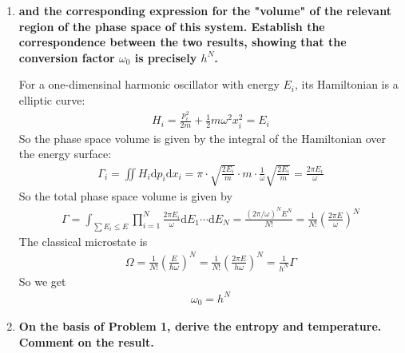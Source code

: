 \documentclass[../../main.tex]{subfiles}
\begin{document}
\begin{enumerate}
    \item \textbf{and the corresponding expression for the "volume" of the relevant region of the phase space of this system. Establish the correspondence between the two results, showing that the conversion factor $\omega_{0}$ is precisely $h^{N}$.}
    
    For a one-dimensinal harmonic oscillator with energy $E_{i}$, its Hamiltonian is a elliptic curve: 
    \begin{align*}
      H_{i} = \frac{p_{i}^{2}}{2m} + \frac{1}{2}m\omega^{2}x_{i}^{2} = E_{i}
    \end{align*}
    So the phase space volume is given by the integral of the Hamiltonian over the energy surface:
    \begin{align*}
      \Gamma_{i} = \iint H_{i}\mathrm{d}p_{i}\mathrm{d}x_{i} = \pi\cdot\sqrt{\frac{2E_{i}}{m}}\cdot m\cdot\frac{1}{\omega} \sqrt{\frac{2E_{i}}{m}}= \frac{2\pi E_{i}}{\omega}
    \end{align*}
    So the total phase space volume is given by 
    \begin{align*}
      \Gamma = \int_{\sum E_{i}\leq E}\prod_{i=1}^{N}\frac{2\pi E_{i}}{\omega}\mathrm{d}E_{1}\cdots\mathrm{d}E_{N} = \frac{(2\pi/\omega)^{N}E^{N}}{N!} = \frac{1}{N!}\left(\frac{2\pi E}{\omega}\right)^{N}
    \end{align*}
    The classical microstate is 
    \begin{align*}
      \Omega = \frac{1}{N!}\left(\frac{E}{\hbar\omega}\right)^{N} = \frac{1}{N!}\left(\frac{2\pi E}{h\omega}\right)^{N} = \frac{1}{h^{N}}\Gamma
    \end{align*}
    So we get
    \begin{align*}
      \boxed{\omega_{0} = h^{N}}
    \end{align*}

    \item \textbf{On the basis of Problem 1, derive the entropy and temperature. Comment on the result.} 
  

\end{enumerate}
\end{document}
